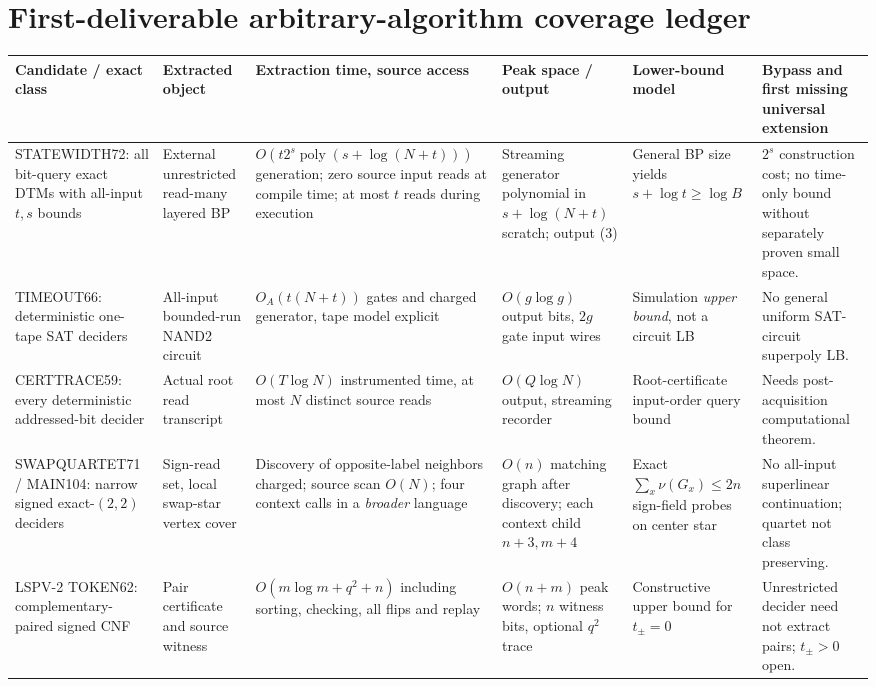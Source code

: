 \documentclass[11pt]{article}
\begin{document}
\section{First-deliverable arbitrary-algorithm coverage ledger}
\scriptsize
\begin{longtable}{@{}p{.145\linewidth}p{.155\linewidth}p{.17\linewidth}p{.155\linewidth}p{.15\linewidth}p{.175\linewidth}@{}}
\toprule
Candidate / exact class & Extracted object & Extraction time, source access & Peak space / output & Lower-bound model & Bypass and first missing universal extension\\
\midrule\endhead
STATEWIDTH72: all bit-query exact DTMs with all-input $t,s$ bounds &
External unrestricted read-many layered BP &
$O(t2^s\operatorname{poly}(s+\log(N+t)))$ generation; zero source input reads at compile time; at most $t$ reads during execution &
Streaming generator polynomial in $s+\log(N+t)$ scratch; output (3) &
General BP size yields $s+\log t\ge\log B$ &
$2^s$ construction cost; no time-only bound without separately proven small space.\\
TIMEOUT66: deterministic one-tape SAT deciders &
All-input bounded-run NAND2 circuit &
$O_A(t(N+t))$ gates and charged generator, tape model explicit &
$O(g\log g)$ output bits, $2g$ gate input wires &
Simulation \emph{upper bound}, not a circuit LB &
No general uniform SAT-circuit superpoly LB.\\
CERTTRACE59: every deterministic addressed-bit decider &
Actual root read transcript &
$O(T\log N)$ instrumented time, at most $N$ distinct source reads &
$O(Q\log N)$ output, streaming recorder &
Root-certificate input-order query bound &
Needs post-acquisition computational theorem.\\
SWAPQUARTET71 / MAIN104: narrow signed exact-$(2,2)$ deciders &
Sign-read set, local swap-star vertex cover &
Discovery of opposite-label neighbors charged; source scan $O(N)$; four context calls in a \emph{broader} language &
$O(n)$ matching graph after discovery; each context child $n+3,m+4$ &
Exact $\sum_x\nu(G_x)\le2n$ sign-field probes on center star &
No all-input superlinear continuation; quartet not class preserving.\\
LSPV-2 TOKEN62: complementary-paired signed CNF &
Pair certificate and source witness &
$O(m\log m+q^2+n)$ including sorting, checking, all flips and replay &
$O(n+m)$ peak words; $n$ witness bits, optional $q^2$ trace &
Constructive upper bound for $t_\pm=0$ &
Unrestricted decider need not extract pairs; $t_\pm>0$ open.\\

\end{longtable}
\end{document}
